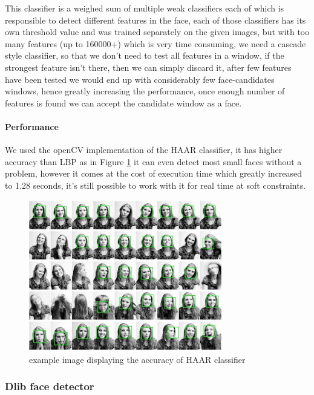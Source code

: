 This classifier is a weighed sum of multiple weak classifiers each of which is responsible to detect different features in the face, each of those classifiers has its own threshold value and was trained separately on the given images, 
but with too many features (up to 160000+) which is very time consuming, we need a cascade style classifier, so that we don't need to test all features in a window, if the strongest feature isn't there, then we can simply discard it, after few features have been tested we would end up with considerably few face-candidates windows, hence greatly increasing the performance, once enough number of features is found we can accept the candidate window as a face.

\paragraph{Performance}
We used the openCV implementation of the HAAR classifier, it has higher accuracy than LBP as in Figure \ref{fig:haar_example} it can even detect most small faces without a problem, however it comes at the cost of execution time which greatly increased to 1.28 seconds, it's still possible to work with it for real time at soft constraints.
\begin{figure}
	\centering
	\includegraphics[width=0.75\textwidth]{images/haar_example.jpg}
	\caption{example image displaying the accuracy of HAAR classifier}
	\label{fig:haar_example}
\end{figure}


\subsubsection{Dlib face detector}
